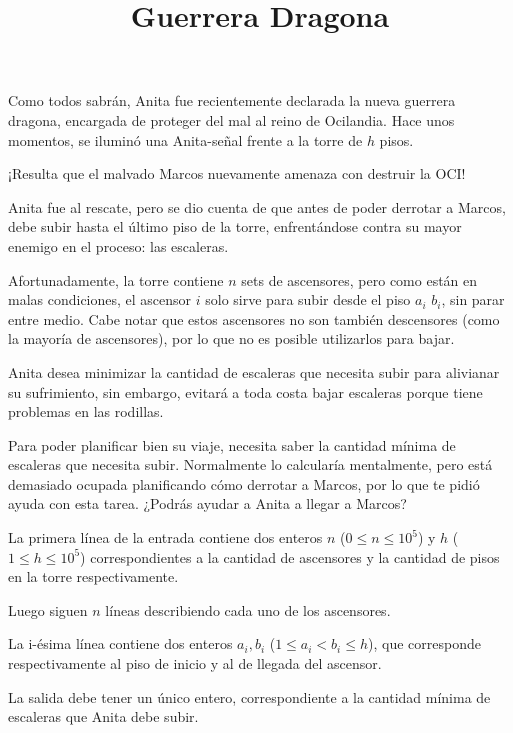 \documentclass{oci}
\title{Guerrera Dragona}
\begin{document}
\begin{problemDescription}
  Como todos sabrán, Anita fue recientemente
  declarada la nueva guerrera dragona, encargada
  de proteger del mal al reino de Ocilandia.
  Hace unos momentos, se iluminó una Anita-señal
  frente a la torre de $h$ pisos.

  ¡Resulta que el malvado Marcos nuevamente amenaza
  con destruir la OCI!

  Anita fue al rescate, pero se dio cuenta de que
  antes de poder derrotar a Marcos, debe subir
  hasta el último piso de la torre, enfrentándose
  contra su mayor enemigo en el proceso: las escaleras.

  Afortunadamente, la torre contiene $n$ sets de ascensores,
  pero como están en malas condiciones, el ascensor $i$
  solo sirve para subir desde el piso $a_i$
  $b_i$, sin parar entre medio. Cabe notar que estos ascensores
  no son también descensores (como la mayoría de ascensores),
  por lo que no es posible utilizarlos para bajar.

  Anita desea minimizar la cantidad de escaleras que
  necesita subir para alivianar su sufrimiento, sin embargo,
  evitará a toda costa bajar escaleras porque tiene
  problemas en las rodillas.

  Para poder planificar bien su viaje, necesita saber la
  cantidad mínima de escaleras que necesita subir.
  Normalmente lo calcularía mentalmente, pero está demasiado
  ocupada planificando cómo derrotar a Marcos, por lo que
  te pidió ayuda con esta tarea. ¿Podrás ayudar a Anita
  a llegar a Marcos?
\end{problemDescription}

\begin{inputDescription}
  La primera línea de la entrada contiene dos enteros
  $n$ ($0 \leq n \leq 10^5$) y $h$ ($1 \leq h \leq 10^5$)
  correspondientes a la cantidad de ascensores y la cantidad
  de pisos en la torre respectivamente.

  Luego siguen $n$ líneas describiendo cada uno de los ascensores.

  La i-ésima línea contiene dos enteros $a_i, b_i$
  ($1 \leq a_i < b_i \leq h$), que corresponde respectivamente
  al piso de inicio y al de llegada del ascensor.
\end{inputDescription}

\begin{outputDescription}
  La salida debe tener un único entero, correspondiente a la cantidad
  mínima de escaleras que Anita debe subir.
\end{outputDescription}
\end{document}
